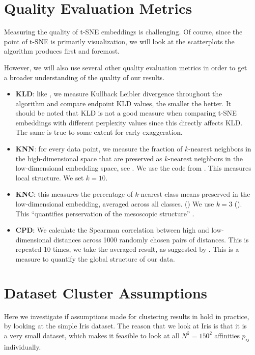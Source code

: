 \section{Quality Evaluation Metrics}
Measuring the quality of t-SNE embeddings is challenging. 
Of course, since the point of t-SNE is primarily visualization, we will look at the scatterplots the algorithm produces first and foremost. 

However, we will also use several other quality evaluation metrics in order to get a broader understanding of the quality of our results. 
\begin{itemize}
    \item \textbf{KLD}: like \cite{belkina19}, we measure Kullback Leibler divergence throughout the algorithm and compare endpoint KLD values, the smaller the better. 
    It should be noted that KLD is not a good measure when comparing t-SNE embeddings with different perplexity values since this directly affects KLD. 
    The same is true to some extent for early exaggeration.  
    \item \textbf{KNN}: for every data point, we measure the fraction of $k$-nearest neighbors in the high-di\-mension\-al space that are preserved as $k$-nearest neighbors in the low-di\-men\-sio\-nal embedding space, see \cite{KoBe19SingleCell}. 
    We use the code from . 
    This measures local structure. 
    We set $k=10$. 
    \item \textbf{KNC}: this measures the percentage of $k$-nearest class means preserved in the low-dimensional embedding, averaged across all classes. ()
    We use $k=3$ (). 
    This \enquote{quantifies perservation of the mesoscopic structure} \cite{KoBe19SingleCell}. 
    \item \textbf{CPD}: We calculate the Spearman correlation between high and low-dimensional distances across 1000 randomly chosen pairs of distances. This is repeated 10 times, we take the averaged result, as suggested by . This is a measure to quantify the global structure of our data. 
\end{itemize}


\section{Dataset Cluster Assumptions}
Here we investigate if assumptions made for clustering results in \cite{LinStei22} hold in practice, by looking at the simple Iris dataset. 
The reason that we look at Iris is that it is a very small dataset, which makes it feasible to look at all $N^2 = 150^2$ affinities $p_{ij}$ individually.  

